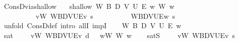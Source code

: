 \begin{isabellebody}
\isamarkupfalse%
\ ConsD{\isacharunderscore}{\kern0pt}via{\isacharunderscore}{\kern0pt}shallow{\isacharcolon}{\kern0pt}\isanewline
\ \ \ shallow{\isacharcolon}{\kern0pt}\ {\isachardoublequoteopen}{\isasymAnd}W\ B\ D\ V\ U\ E\ w{\isachardot}{\kern0pt}\ W\ w\ {\isasymLongrightarrow}\isanewline
\ \ \ \ \ \ {\isacharparenleft}{\kern0pt}{\isasymforall}{\isasymgamma}{\isachardot}{\kern0pt}\ {\isasymGamma}\ {\isasymgamma}\ {\isasymlongrightarrow}\ {\isacharparenleft}{\kern0pt}{\isasymforall}v{\isacharcolon}{\kern0pt}W{\isachardot}{\kern0pt}\ {\isasymlangle}W{\isacharcomma}{\kern0pt}B{\isacharcomma}{\kern0pt}D{\isacharcomma}{\kern0pt}V{\isacharcomma}{\kern0pt}U{\isacharcomma}{\kern0pt}E{\isasymrangle}{\isacharcomma}{\kern0pt}v\ {\isasymTurnstile}\isactrlsup s\ {\isasymlparr}{\isasymgamma}{\isasymrparr}{\isacharparenright}{\kern0pt}{\isacharparenright}{\kern0pt}\isanewline
\ \ \ \ \ \ \ \ {\isasymLongrightarrow}\ {\isasymlangle}W{\isacharcomma}{\kern0pt}B{\isacharcomma}{\kern0pt}D{\isacharcomma}{\kern0pt}V{\isacharcomma}{\kern0pt}U{\isacharcomma}{\kern0pt}E{\isasymrangle}{\isacharcomma}{\kern0pt}w\ {\isasymTurnstile}\isactrlsup s\ {\isasymlparr}{\isasymphi}{\isasymrparr}{\isachardoublequoteclose}\isanewline
\ \ \ {\isachardoublequoteopen}{\isasymGamma}\ {\isasymTurnstile}\ {\isasymphi}{\isachardoublequoteclose}\isanewline
%
\isadelimproof
%
\endisadelimproof
%
\isatagproof
{}\isamarkupfalse%
\ {\isacharparenleft}{\kern0pt}unfold\ ConsD{\isacharunderscore}{\kern0pt}def{\isacharcomma}{\kern0pt}\ intro\ allI\ impI{\isacharparenright}{\kern0pt}\isanewline
\ \ \isamarkupfalse%
\ W\ B\ D\ V\ U\ E\ w\isanewline
\ \ \isamarkupfalse%
\ sat{\isacharcolon}{\kern0pt}\ {\isachardoublequoteopen}{\isasymforall}{\isasymgamma}{\isachardot}{\kern0pt}\ {\isasymGamma}\ {\isasymgamma}\ {\isasymlongrightarrow}\ {\isacharparenleft}{\kern0pt}{\isasymforall}v{\isacharcolon}{\kern0pt}W{\isachardot}{\kern0pt}\ {\isasymlangle}W{\isacharcomma}{\kern0pt}B{\isacharcomma}{\kern0pt}D{\isacharcomma}{\kern0pt}V{\isacharcomma}{\kern0pt}U{\isacharcomma}{\kern0pt}E{\isasymrangle}{\isacharcomma}{\kern0pt}v\ {\isasymTurnstile}\isactrlsup d\ {\isasymgamma}{\isacharparenright}{\kern0pt}{\isachardoublequoteclose}\ \ wW{\isacharcolon}{\kern0pt}\ {\isachardoublequoteopen}W\ w{\isachardoublequoteclose}\isanewline
\ \ \isamarkupfalse%
\ satS{\isacharcolon}{\kern0pt}\ {\isachardoublequoteopen}{\isasymforall}{\isasymgamma}{\isachardot}{\kern0pt}\ {\isasymGamma}\ {\isasymgamma}\ {\isasymlongrightarrow}\ {\isacharparenleft}{\kern0pt}{\isasymforall}v{\isacharcolon}{\kern0pt}W{\isachardot}{\kern0pt}\ {\isasymlangle}W{\isacharcomma}{\kern0pt}B{\isacharcomma}{\kern0pt}D{\isacharcomma}{\kern0pt}V{\isacharcomma}{\kern0pt}U{\isacharcomma}{\kern0pt}E{\isasymrangle}{\isacharcomma}{\kern0pt}v\ {\isasymTurnstile}\isactrlsup s\ {\isasymlparr}{\isasymgamma}{\isasymrparr}{\isacharparenright}{\kern0pt}{\isachardoublequoteclose}\isanewline

\end{isabellebody}

